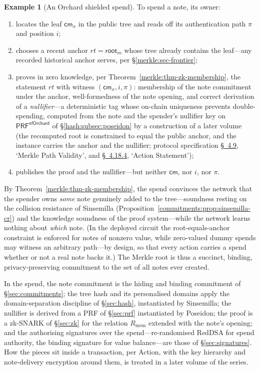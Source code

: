 \documentclass[11pt,a4paper]{article}
\theoremstyle{definition}
\newtheorem{example}[theorem]{Example}
\theoremstyle{remark}
\begin{document}
\begin{example}[An Orchard shielded spend]
To spend a note, its owner:
\begin{enumerate}
\item locates the leaf \(\mathsf{cm}_x\) in the public tree and reads
  off its authentication path \(\pi\) and position \(i\);
\item chooses a recent anchor \(\mathit{rt} = \mathsf{root}_m\) whose
  tree already contains the leaf---any recorded historical anchor
  serves, per \S\ref{merkle:sec-frontier};
\item proves in zero knowledge, per
  Theorem~\ref{merkle:thm-zk-membership}, the statement
  \(\mathit{rt}\) with witness \((\mathsf{cm}_x, i, \pi)\): membership
  of the note commitment under the anchor, well-formedness of the
  note opening, and correct derivation of a \emph{nullifier}---a
  deterministic tag whose on-chain uniqueness prevents
  double-spending, computed from the note and the spender's nullifier
  key on \(\mathsf{PRF}^{\mathsf{nfOrchard}}\) of
  \S\ref{hash:subsec:poseidon} by a construction of a later volume (the
  recomputed root is
  constrained to
  equal the public anchor, and the instance carries the anchor and
  the nullifier; protocol specification
  \href{https://zips.z.cash/protocol/protocol.pdf\#merklepath}{\S~4.9}, `Merkle Path Validity', and \href{https://zips.z.cash/protocol/protocol.pdf\#actionstatement}{\S~4.18.4}, `Action
  Statement');
\item publishes the proof and the nullifier---but neither
  \(\mathsf{cm}\), nor \(i\), nor \(\pi\).
\end{enumerate}
By Theorem~\ref{merkle:thm-zk-membership}, the spend convinces the
network that the spender owns \emph{some} note genuinely added to the
tree---soundness resting on the collision resistance of Sinsemilla
(Proposition~\ref{commitments:prop:sinsemilla-cr}) and the knowledge
soundness of the proof system---while the network learns nothing
about \emph{which} note. (In the deployed circuit the
root-equals-anchor constraint is enforced for notes of nonzero value,
while zero-valued dummy spends may witness an arbitrary path---by
design, so that every action carries a spend whether or not a real
note backs it.) The Merkle root is thus a
succinct, binding, privacy-preserving commitment to the set of all
notes ever created.
\end{example}

In the spend, the note commitment is the hiding and binding commitment
of \S\ref{sec:commitments}; the tree hash and its personalised domains
apply the domain-separation discipline of \S\ref{sec:hash},
instantiated by Sinsemilla; the nullifier is derived from a PRF of
\S\ref{sec:prf} instantiated by Poseidon; the proof is a zk-SNARK of
\S\ref{sec:zk} for the relation \(R_{\mathrm{mem}}\) extended with the
note's opening; and the authorising signatures over the
spend---re-randomised RedDSA for spend authority, the binding signature
for value balance---are those of \S\ref{sec:signatures}. How the pieces
sit inside a transaction, per Action, with the key hierarchy and
note-delivery encryption around them, is treated in a later volume of
the series.
\end{document}
